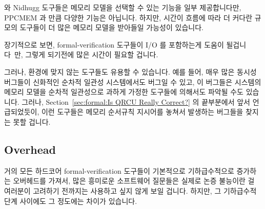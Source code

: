  와 Nidhugg 도구들은 메모리 모델을 선택할 수 있는 기능을 일부
제공합니다만, PPCMEM 과  만큼 다양한 기능은 아닙니다.
하지만, 시간이 흐름에 따라 더 커다란 규모의 도구들이 더 많은 메모리 모델을
받아들일 가능성이 있습니다.

장기적으로 보면, formal-verification 도구들이 I/O 를 포함하는게 도움이
될겁니다~\cite{PaulEMcKenney2016LinuxKernelMMIO}만, 그렇게 되기전에 많은 시간이
필요할 겁니다.
\iffalse

The \co{cbmc} and Nidhugg tools provide some ability to select
memory models, but do not provide the variety that PPCMEM and
\co{herd} do.
However, it is likely that the larger-scale tools will adopt
a greater variety of memory models as time goes on.

In the longer term, it would be helpful for formal-verification
tools to include I/O~\cite{PaulEMcKenney2016LinuxKernelMMIO},
but it may be some time before this comes to pass.
\fi

그러나, 환경에 맞지 않는 도구들도 유용할 수 있습니다.
예를 들어, 매우 많은 동시성 버그들이 신화적인 순차적 일관성 시스템에서도 버그일 수 있고, 이 버그들은 시스템의 메모리 모델을 순차적 일관성으로 과하게 가정한 도구들에 의해서도 파악될 수도 있습니다.
그러나, Section~\ref{sec:formal:Is QRCU Really Correct?} 의 끝부분에서 앞서
언급되었듯이, 이런 도구들은 메모리 순서규칙 지시어를 놓쳐서 발생하는 버그들을
찾지는 못할 겁니다.
\iffalse

Nevertheless, tools that fail to match the environment can still
be useful.
For example, a great many concurrency bugs would still be bugs on
a mythical sequentially consistent system, and these bugs could
be located by a tool that over-approximated the system's memory model
with sequential consistency.
Nevertheless, these tools will fail to find bugs involving missing
memory-ordering directives, as noted in the aforementioned
cautionary tale of
Section~\ref{sec:formal:Is QRCU Really Correct?}.
\fi

\subsection{Overhead}
\label{sec:future:Overhead}

거의 모든 하드코어 formal-verification 도구들이 기본적으로 기하급수적으로
증가하는 오버헤드를 가져서, 많은 흥미로운 소프트웨어 질문들은 실제로 논증
불능이란 걸 여러분이 고려하기 전까지는 사용하고 싶지 않게 보일 겁니다.
하지만, 그 기하급수적 단계 사이에도 그 정도에는 차이가 있습니다.

